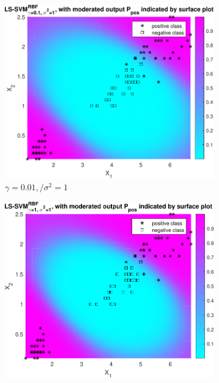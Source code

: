 \documentclass{article}
\begin{document}
            \begin{figure}[h]
            
                 \centering
                 \begin{subfigure}[b]{0.3\textwidth}
                     \centering
                     \includegraphics[width=\textwidth]{Assignment 1/figures/bayes_rbf_gamma_1.000000e-01_sig2_1.pdf}
                    \caption{$\gamma =0.01,/ \sigma^2 = 1$}
                     \label{fig:bayes_4}
                 \end{subfigure}
                 \hfill
                 \begin{subfigure}[b]{0.3\textwidth}
                     \centering
                     \includegraphics[width=\textwidth]{Assignment 1/figures/bayes_rbf_gamma_1_sig2_1.pdf}

\end{subfigure}
\end{figure}
\end{document}

